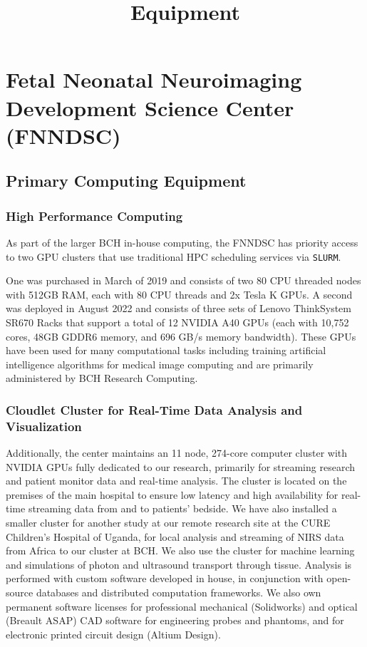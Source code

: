 \documentclass[11pt]{amsart}
\title{Equipment}
\author{}
\date{}
\begin{document}
\maketitle
\hypertarget{x-fetal-neonatal-neuroimaging-development-science-center-(fnndsc)}{\section*{Fetal Neonatal Neuroimaging Development Science Center (FNNDSC)}}
\hypertarget{x-primary-computing-equipment}{\subsection*{Primary Computing Equipment}}
\hypertarget{x-high-performance-computing}{\subsubsection*{High Performance Computing}}
As part of the larger BCH in-house computing, the FNNDSC has priority access to two GPU clusters that use traditional HPC scheduling services via \texttt{SLURM}.


One was purchased in March of 2019 and consists of two 80 CPU threaded
nodes with 512GB RAM, each with 80 CPU threads and 2x Tesla K GPUs. A second was deployed in August 2022 and consists of three sets of Lenovo ThinkSystem SR670 Racks that support a total of 12 NVIDIA A40 GPUs (each with 10,752 cores, 48GB GDDR6 memory, and 696 GB/s memory bandwidth). These GPUs have been used for many computational tasks including training artificial intelligence algorithms for medical image computing and are primarily administered by BCH Research Computing.


\hypertarget{x-cloudlet-cluster-for-real-time-data-analysis-and-visualization}{\subsubsection*{Cloudlet Cluster for Real-Time Data Analysis and Visualization}}
Additionally, the center maintains an 11 node, 274-core computer cluster with NVIDIA GPUs fully dedicated to our research, primarily for streaming research and patient monitor data and real-time analysis. The cluster is located on the premises of the main hospital to ensure low latency and high availability for real-time streaming data from and to patients' bedside. We have also installed a smaller cluster for another study at our remote research site at the CURE Children’s Hospital of Uganda, for local analysis and streaming of NIRS data from Africa to our cluster at BCH. We also use the cluster for machine learning and simulations of photon and ultrasound transport through tissue. Analysis is performed with custom software developed in house, in conjunction with open-source databases and distributed computation frameworks. We also own permanent software licenses for professional mechanical (Solidworks) and optical (Breault ASAP) CAD software for engineering probes and phantoms, and for electronic printed circuit design (Altium Design).
\end{document}

